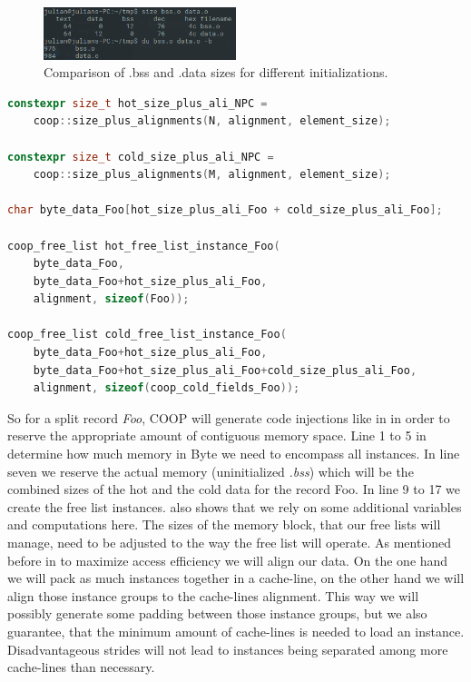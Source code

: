 \begin{figure}[!htbp]
	\centering
	\includegraphics[width=0.5\textwidth, height=0.2\textwidth]{PICs/bss_data_comparison}
	\caption{Comparison of .bss and .data sizes for different initializations.}
	\label{seg_sizes}
\end{figure}
\begin{lstlisting}[language=C++,name={Code injection to generate contiguous block of memory for a record Foo's instances.},morekeywords={constexpr, size_t, coop_free_list},label={cont_mem_foo}]
constexpr size_t hot_size_plus_ali_NPC =
	coop::size_plus_alignments(N, alignment, element_size);

constexpr size_t cold_size_plus_ali_NPC =
	coop::size_plus_alignments(M, alignment, element_size);

char byte_data_Foo[hot_size_plus_ali_Foo + cold_size_plus_ali_Foo];

coop_free_list hot_free_list_instance_Foo(
	byte_data_Foo,
	byte_data_Foo+hot_size_plus_ali_Foo,
	alignment, sizeof(Foo));

coop_free_list cold_free_list_instance_Foo(
	byte_data_Foo+hot_size_plus_ali_Foo,
	byte_data_Foo+hot_size_plus_ali_Foo+cold_size_plus_ali_Foo,
	alignment, sizeof(coop_cold_fields_Foo));
\end{lstlisting}
So for a split record \textit{Foo}, COOP will generate code injections like in  in order to reserve the appropriate amount of contiguous memory space. Line 1 to 5 in  determine how much memory in Byte we need to encompass all instances. In line seven we reserve the actual memory (uninitialized \textit{.bss}) which will be the combined sizes of the hot and the cold data for the record Foo. In line 9 to 17 we create the free list instances.  also shows that we rely on some additional variables and computations here. The sizes of the memory block, that our free lists will manage, need to be adjusted to the way the free list will operate. As mentioned before in  to maximize access efficiency we will align our data. On the one hand we will pack as much instances together in a cache-line, on the other hand we will align those instance groups to the cache-lines alignment. This way we will possibly generate some padding between those instance groups, but we also guarantee, that the minimum amount of cache-lines is needed to load an instance. Disadvantageous strides will not lead to instances being separated among more cache-lines than necessary.\\
